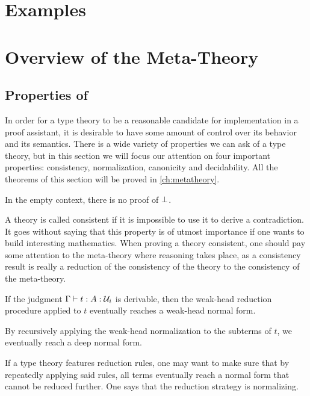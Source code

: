\section{Examples}
\label{sec:examples}


\section{Overview of the Meta-Theory}
\label{sec:properties}

\subsection{Properties of \SetoidCC}

In order for a type theory to be a reasonable candidate for implementation 
in a proof assistant, it is desirable to have some amount of control over its 
behavior and its semantics.
% 
There is a wide variety of properties we can ask of a type theory, but in this 
section we will focus our attention on four important properties: consistency,
normalization, canonicity and decidability. 
% 
All the theorems of this section will be proved in \cref{ch:metatheory}.

\begin{theorem}[Consistency]
	In the empty context, there is no proof of \( \bot \).
\end{theorem}

A theory is called consistent if it is impossible to use it to derive a contradiction. It goes
without saying that this property is of utmost importance if one wants to build interesting
mathematics. When proving a theory consistent, one should pay some attention to the meta-theory
where reasoning takes place, as a consistency result is really a reduction of the consistency of
the theory to the consistency of the meta-theory.

\begin{theorem}[Normalization]
	If the judgment \( \Gamma \vdash t : A : \mathcal{U}_i \) is derivable,
	then the weak-head reduction procedure applied to \( t \) eventually 
	reaches a weak-head normal form.

	By recursively applying the weak-head normalization to the subterms of 
	\( t \), we eventually reach a deep normal form.
\end{theorem}

If a type theory features reduction rules, one may want to make sure that by repeatedly applying
said rules, all terms eventually reach a normal form that cannot be reduced further.
One says that the reduction strategy is normalizing.

